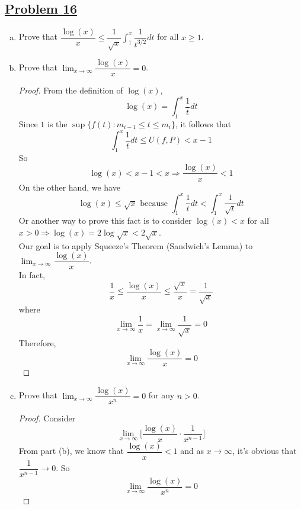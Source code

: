 \documentclass[10pt,letterpaper]{article}
\begin{document}
	\subsection*{{\color{purple}\underline{Problem 16}}}
	\text{ } 
	\begin{enumerate}[(a)]
\item Prove that $\dfrac{\log(x)}{x} \leq \dfrac{1}{\sqrt{x}} 
\displaystyle\int_1^x \dfrac{1}{t^{3/2}} dt$ for all $x \geq 1$.

\item Prove that $\displaystyle\lim_{x\to \infty} \dfrac{\log(x)}{x} = 0$.
\begin{proof}
From the definition of $\log(x)$,
$$\log(x) = \int_1^x  \dfrac{1}{t} dt$$
Since $1$ is the $\sup\{f(t) : m_{i-1} \leq t \leq m_i\}$, it follows that
$$ \int_1^x  \dfrac{1}{t} dt \leq U(f, P) < x - 1$$
So $$\log(x) < x - 1 < x \Rightarrow \dfrac{\log(x)}{x} < 1$$
On the other hand, we have
$$\log(x) \leq \sqrt{x} \text{ because }  \int_1^x\dfrac{1}{t} dt < \int_1^x\dfrac{1}{\sqrt{t}}dt$$
Or another way to prove this fact is to consider $\log(x) < x$ for all $x > 0 \Rightarrow \log(x) = 2 \log \sqrt{x} < 2 \sqrt{x}$. \\

Our goal is to apply Squeeze's Theorem (Sandwich's Lemma) to $\displaystyle\lim_{x\to \infty} \dfrac{\log(x)}{x}$. \\
In fact,
$$\dfrac{1}{x} \leq \dfrac{\log(x)}{x} \leq \dfrac{\sqrt{x}}{x} = \dfrac{1}{\sqrt{x}}$$
where
$$
	\displaystyle\lim_{x\to \infty} \dfrac{1}{x} 
	= \displaystyle\lim_{x\to \infty} \dfrac{1}{\sqrt{x}} = 0
$$
Therefore,
$$\displaystyle\lim_{x\to \infty} \dfrac{\log(x)}{x} = 0$$

\end{proof}



\item Prove that 
$\displaystyle\lim_{x\to \infty} \dfrac{\log(x)}{x^n} = 0$ for any $n > 0$.	
\begin{proof}
	Consider
	$$
	\displaystyle\lim_{x\to \infty} \bigg[\dfrac{\log(x)}{x} \cdot \dfrac{1}{x^{n-1}} \bigg]$$
	From part (b), we know that $\dfrac{\log(x)}{x} < 1$ and as $x \rightarrow \infty$, it's obvious
	that $\dfrac{1}{x^{n-1}} \rightarrow 0$. So
	$$\displaystyle\lim_{x\to \infty} \dfrac{\log(x)}{x^n} = 0$$
\end{proof}


	\end{enumerate}
	
\end{document}
